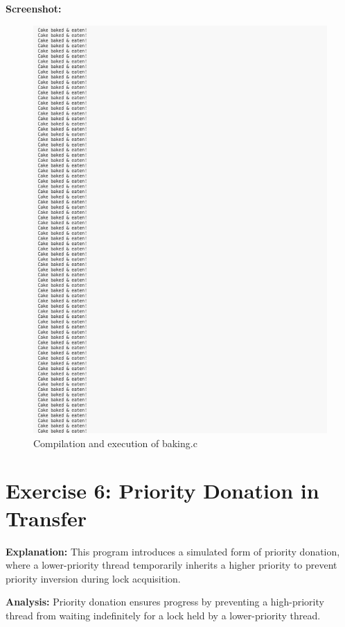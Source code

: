 \documentclass[a4paper,12pt]{article}
\begin{document}
\textbf{Screenshot:}  
\begin{figure}[h]
\centering
\includegraphics[width=\textwidth]{baking_output.png}
\caption{Compilation and execution of baking.c}
\end{figure}

\section{Exercise 6: Priority Donation in Transfer}


\textbf{Explanation:}  
This program introduces a simulated form of priority donation, where a lower-priority thread temporarily inherits a higher priority to prevent priority inversion during lock acquisition.

\textbf{Analysis:}  
Priority donation ensures progress by preventing a high-priority thread from waiting indefinitely for a lock held by a lower-priority thread.
\end{document}
